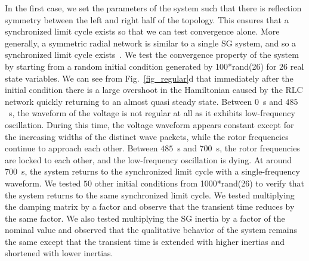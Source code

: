 In the first case, we set the parameters of the system such that there is reflection symmetry between the left and right half of the topology. This ensures that a synchronized limit cycle exists so that we can test convergence alone. More generally, a symmetric radial network is similar to a single SG system, and so a synchronized limit cycle exists~\cite{johnson2014synchronization}. We test the convergence property of the system by starting from a random initial condition generated by 100*rand(26) for $26$ real state variables. We can see from Fig.~\ref{fig_regular}d that immediately after the initial condition there is a large overshoot in the Hamiltonian caused by the RLC network quickly returning to an almost quasi steady state. Between $0$~\unit{s} and $485$~\unit{s}, the waveform of the voltage is not regular at all as it exhibits low-frequency oscillation. During this time, the voltage waveform appears constant except for the increasing widths of the distinct wave packets, while the rotor frequencies continue to approach each other. Between $485$~\unit{s} and $700$~\unit{s}, the rotor frequencies are locked to each other, and the low-frequency oscillation is dying. At around $700$~\unit{s}, the system returns to the synchronized limit cycle with a single-frequency waveform. We tested $50$ other initial conditions from 1000*rand(26) to verify that the system returns to the same synchronized limit cycle. We tested multiplying the damping matrix by a factor and observe that the transient time reduces by the same factor. We also tested multiplying the SG inertia by a factor of the nominal value and observed that the qualitative behavior of the system remains the same except that the transient time is extended with higher inertias and shortened with lower inertias. %

